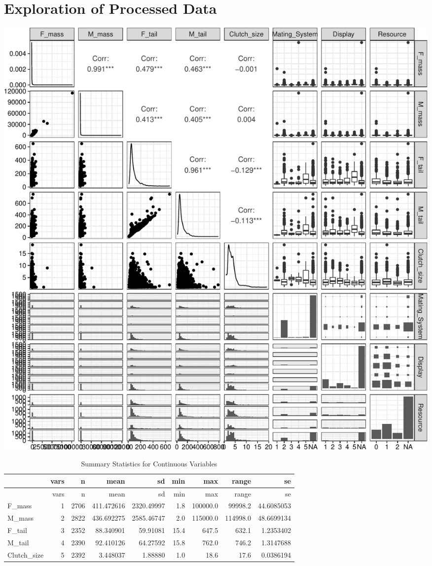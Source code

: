 \documentclass[
  12pt,
]{article}
\begin{document}
\newpage

\hypertarget{exploration-of-processed-data}{%
\section{Exploration of Processed
Data}\label{exploration-of-processed-data}}

\includegraphics{Project_Code_files/figure-latex/gg exploration-1.pdf}

\newpage

\begin{longtable}[]{@{}lrrrrrrrr@{}}
\caption{Summary Statistics for Continuous Variables}\tabularnewline
\toprule
& vars & n & mean & sd & min & max & range & se \\
\midrule
\endfirsthead
\toprule
& vars & n & mean & sd & min & max & range & se \\
\midrule
\endhead
F\_mass & 1 & 2706 & 411.472616 & 2320.49997 & 1.8 & 100000.0 & 99998.2
& 44.6085053 \\
M\_mass & 2 & 2822 & 436.692275 & 2585.46747 & 2.0 & 115000.0 & 114998.0
& 48.6699134 \\
F\_tail & 3 & 2352 & 88.340901 & 59.91081 & 15.4 & 647.5 & 632.1 &
1.2353402 \\
M\_tail & 4 & 2390 & 92.410126 & 64.27592 & 15.8 & 762.0 & 746.2 &
1.3147688 \\
Clutch\_size & 5 & 2392 & 3.448037 & 1.88880 & 1.0 & 18.6 & 17.6 &
0.0386194 \\
\bottomrule
\end{longtable}
\end{document}
